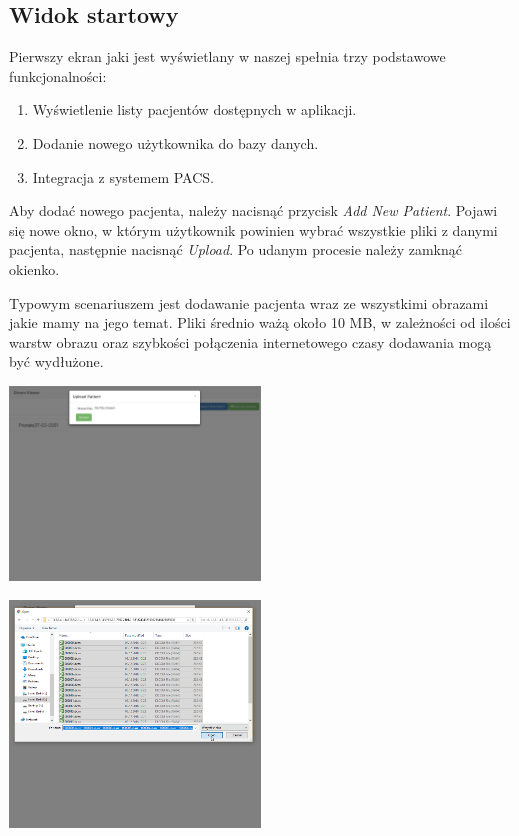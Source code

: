 \documentclass[a4paper,11pt,twoside]{report}
\theoremstyle{definition}
\begin{document}
\subsection{Widok startowy}
Pierwszy ekran jaki jest wyświetlany w naszej spełnia trzy podstawowe funkcjonalności:
\begin{enumerate}
\item Wyświetlenie listy pacjentów dostępnych w aplikacji.
\item Dodanie nowego użytkownika do bazy danych.
\item Integracja z systemem PACS.
\end{enumerate}
Aby dodać nowego pacjenta, należy nacisnąć przycisk \textit{Add New Patient}. Pojawi się nowe okno, w którym użytkownik powinien wybrać wszystkie pliki z danymi pacjenta, następnie nacisnąć \textit{Upload}. Po udanym procesie należy zamknąć okienko.
\par
Typowym scenariuszem jest dodawanie pacjenta wraz ze wszystkimi obrazami jakie mamy na jego temat. Pliki średnio ważą około 10 MB, w zależności od ilości warstw obrazu oraz szybkości połączenia internetowego czasy dodawania mogą być wydłużone.
\begin{minipage}[h]{\linewidth}
	\centering
	\includegraphics[width=0.5\textwidth]{FrontScreen/Main/15.png}
\end{minipage}
\begin{minipage}[h]{\linewidth}
	\centering
	\includegraphics[width=0.5\textwidth]{FrontScreen/Main/95.png}
\end{minipage}
\end{document}
